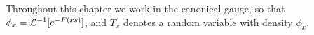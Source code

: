 %
%
%
%

Throughout this chapter we work in the canonical gauge, so that
$\phi_x = \mathcal{L}^{-1}[e^{-F(x s)}]$, and $T_x$ denotes a random variable with density $\phi_x$.

